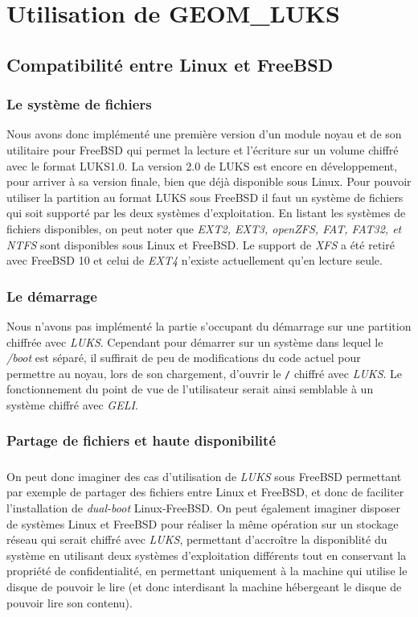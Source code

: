 \chapter{Utilisation de GEOM\_LUKS}

\section{Compatibilité entre Linux et FreeBSD}

\subsection{Le système de fichiers}
Nous avons donc implémenté une première version d'un module noyau et de son
utilitaire pour FreeBSD qui permet la lecture et l'écriture sur un volume chiffré
avec le format LUKS1.0. La version 2.0 de LUKS est encore en développement,
pour arriver à sa version finale, bien que déjà disponible sous Linux. Pour
pouvoir utiliser la partition au format LUKS sous FreeBSD il faut un système de
fichiers qui soit supporté par les deux systèmes d'exploitation. En listant
les systèmes de fichiers disponibles, on peut noter que {\em EXT2, EXT3, openZFS,
FAT, FAT32, et NTFS} sont disponibles sous Linux et FreeBSD. Le support de {\em
XFS} a été retiré avec FreeBSD 10 et celui de {\em EXT4} n'existe actuellement
qu'en lecture seule.

\subsection{Le démarrage}
Nous n'avons pas implémenté la partie s'occupant du démarrage sur une partition
chiffrée avec {\em LUKS}. Cependant pour démarrer sur un système dans lequel le
{\em /boot} est séparé, il suffirait de peu de modifications du code actuel pour
permettre au noyau, lors de son chargement, d'ouvrir le \texttt{/} chiffré avec
{\em LUKS}. Le fonctionnement du point de vue de l'utilisateur serait ainsi
semblable à un système chiffré avec {\em GELI}.

\subsection{Partage de fichiers et haute disponibilité}
\paragraph{}
On peut donc imaginer des cas d'utilisation de {\em LUKS} sous FreeBSD
permettant par exemple de partager des fichiers entre Linux et FreeBSD, et donc
de faciliter l'installation de {\em dual-boot} Linux-FreeBSD. On peut également
imaginer disposer de systèmes Linux et FreeBSD pour réaliser la même opération
sur un stockage réseau qui serait chiffré avec {\em LUKS}, permettant
d'accroître la disponiblité du système en utilisant deux systèmes d'exploitation
différents tout en conservant la propriété de confidentialité, en permettant
uniquement à la machine qui utilise le disque de pouvoir le lire (et donc
interdisant la machine hébergeant le disque de pouvoir lire son contenu).

